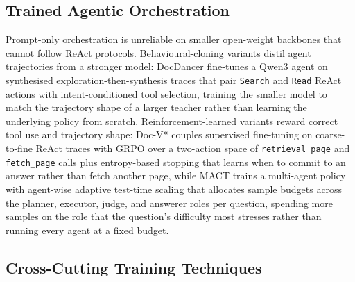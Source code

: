 \documentclass[11pt]{article}
\begin{document}
\subsection{Trained Agentic Orchestration}
\label{sec:train-orchestration}

Prompt-only orchestration is unreliable on smaller open-weight backbones that cannot follow ReAct protocols. Behavioural-cloning variants distil agent trajectories from a stronger model: DocDancer \cite{zhang2026docdancer} fine-tunes a Qwen3 agent on synthesised exploration-then-synthesis traces that pair \texttt{Search} and \texttt{Read} ReAct actions with intent-conditioned tool selection, training the smaller model to match the trajectory shape of a larger teacher rather than learning the underlying policy from scratch. Reinforcement-learned variants reward correct tool use and trajectory shape: Doc-V* \cite{zheng2026docv} couples supervised fine-tuning on coarse-to-fine ReAct traces with GRPO over a two-action space of \texttt{retrieval\_page} and \texttt{fetch\_page} calls plus entropy-based stopping that learns when to commit to an answer rather than fetch another page, while MACT \cite{yu2025visual} trains a multi-agent policy with agent-wise adaptive test-time scaling that allocates sample budgets across the planner, executor, judge, and answerer roles per question, spending more samples on the role that the question's difficulty most stresses rather than running every agent at a fixed budget.

\subsection{Cross-Cutting Training Techniques}
\label{sec:train-crosscutting}
\end{document}
